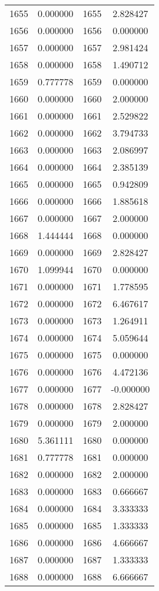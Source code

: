 \documentclass[12pt]{article}
\begin{document}
\begin{longtable}{@{}cccc@{}}
1655 & 0.000000 & 1655 & 2.828427 \\
1656 & 0.000000 & 1656 & 0.000000 \\
1657 & 0.000000 & 1657 & 2.981424 \\
1658 & 0.000000 & 1658 & 1.490712 \\
1659 & 0.777778 & 1659 & 0.000000 \\
1660 & 0.000000 & 1660 & 2.000000 \\
1661 & 0.000000 & 1661 & 2.529822 \\
1662 & 0.000000 & 1662 & 3.794733 \\
1663 & 0.000000 & 1663 & 2.086997 \\
1664 & 0.000000 & 1664 & 2.385139 \\
1665 & 0.000000 & 1665 & 0.942809 \\
1666 & 0.000000 & 1666 & 1.885618 \\
1667 & 0.000000 & 1667 & 2.000000 \\
1668 & 1.444444 & 1668 & 0.000000 \\
1669 & 0.000000 & 1669 & 2.828427 \\
1670 & 1.099944 & 1670 & 0.000000 \\
1671 & 0.000000 & 1671 & 1.778595 \\
1672 & 0.000000 & 1672 & 6.467617 \\
1673 & 0.000000 & 1673 & 1.264911 \\
1674 & 0.000000 & 1674 & 5.059644 \\
1675 & 0.000000 & 1675 & 0.000000 \\
1676 & 0.000000 & 1676 & 4.472136 \\
1677 & 0.000000 & 1677 & -0.000000 \\
1678 & 0.000000 & 1678 & 2.828427 \\
1679 & 0.000000 & 1679 & 2.000000 \\
1680 & 5.361111 & 1680 & 0.000000 \\
1681 & 0.777778 & 1681 & 0.000000 \\
1682 & 0.000000 & 1682 & 2.000000 \\
1683 & 0.000000 & 1683 & 0.666667 \\
1684 & 0.000000 & 1684 & 3.333333 \\
1685 & 0.000000 & 1685 & 1.333333 \\
1686 & 0.000000 & 1686 & 4.666667 \\
1687 & 0.000000 & 1687 & 1.333333 \\
1688 & 0.000000 & 1688 & 6.666667 \\

\end{longtable}
\end{document}
